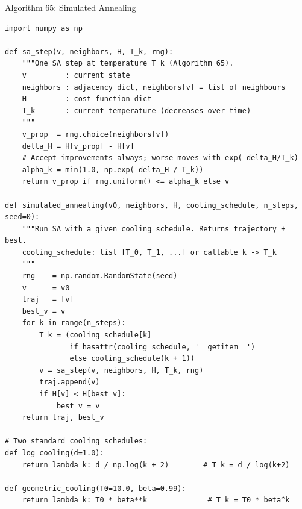 \documentclass[aspectratio=169,10pt]{beamer}
\begin{document}
\begin{frame}[fragile]{Algorithm 65: Simulated Annealing}
  \begin{lstlisting}[style=python]
import numpy as np

def sa_step(v, neighbors, H, T_k, rng):
    """One SA step at temperature T_k (Algorithm 65).
    v         : current state
    neighbors : adjacency dict, neighbors[v] = list of neighbours
    H         : cost function dict
    T_k       : current temperature (decreases over time)
    """
    v_prop  = rng.choice(neighbors[v])
    delta_H = H[v_prop] - H[v]
    # Accept improvements always; worse moves with exp(-delta_H/T_k)
    alpha_k = min(1.0, np.exp(-delta_H / T_k))
    return v_prop if rng.uniform() <= alpha_k else v

def simulated_annealing(v0, neighbors, H, cooling_schedule, n_steps, seed=0):
    """Run SA with a given cooling schedule. Returns trajectory + best.
    cooling_schedule: list [T_0, T_1, ...] or callable k -> T_k
    """
    rng    = np.random.RandomState(seed)
    v      = v0
    traj   = [v]
    best_v = v
    for k in range(n_steps):
        T_k = (cooling_schedule[k]
               if hasattr(cooling_schedule, '__getitem__')
               else cooling_schedule(k + 1))
        v = sa_step(v, neighbors, H, T_k, rng)
        traj.append(v)
        if H[v] < H[best_v]:
            best_v = v
    return traj, best_v

# Two standard cooling schedules:
def log_cooling(d=1.0):
    return lambda k: d / np.log(k + 2)        # T_k = d / log(k+2)

def geometric_cooling(T0=10.0, beta=0.99):
    return lambda k: T0 * beta**k              # T_k = T0 * beta^k
  \end{lstlisting}
\end{frame}
\end{document}
